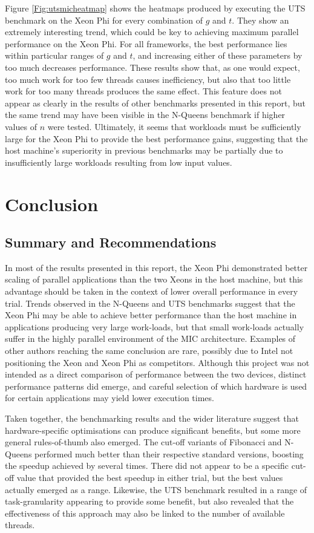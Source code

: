 \documentclass{report}
\begin{document}
Figure \ref{Fig:utsmicheatmap} shows the heatmaps produced by executing the UTS benchmark on the Xeon Phi for every combination of \(g\) and \(t\). They show an extremely interesting trend, which could be key to achieving maximum parallel performance on the Xeon Phi. For all frameworks, the best performance lies within particular ranges of \(g\) and \(t\), and increasing either of these parameters by too much decreases performance. These results show that, as one would expect, too much work for too few threads causes inefficiency, but also that too little work for too many threads produces the same effect. This feature does not appear as clearly in the results of other benchmarks presented in this report, but the same trend may have been visible in the N-Queens benchmark if higher values of \(n\) were tested. Ultimately, it seems that workloads must be sufficiently large for the Xeon Phi to provide the best performance gains, suggesting that the host machine's superiority in previous benchmarks may be partially due to insufficiently large workloads resulting from low input values.

\chapter{Conclusion} \label{Sec:conclusion}

\section{Summary and Recommendations}

In most of the results presented in this report, the Xeon Phi demonstrated better scaling of parallel applications than the two Xeons in the host machine, but this advantage should be taken in the context of lower overall performance in every trial. Trends observed in the N-Queens and UTS benchmarks suggest that the Xeon Phi may be able to achieve better performance than the host machine in applications producing very large work-loads, but that small work-loads actually suffer in the highly parallel environment of the MIC architecture. Examples of other authors reaching the same conclusion are rare, possibly due to Intel not positioning the Xeon and Xeon Phi as competitors. Although this project was not intended as a direct comparison of performance between the two devices, distinct performance patterns did emerge, and careful selection of which hardware is used for certain applications may yield lower execution times.

Taken together, the benchmarking results and the wider literature suggest that hardware-specific optimisations can produce significant benefits, but some more general rules-of-thumb also emerged. The cut-off variants of Fibonacci and N-Queens performed much better than their respective standard versions, boosting the speedup achieved by several times. There did not appear to be a specific cut-off value that provided the best speedup in either trial, but the best values actually emerged as a range. Likewise, the UTS benchmark resulted in a range of task-granularity appearing to provide some benefit, but also revealed that the effectiveness of this approach may also be linked to the number of available threads.
\end{document}

